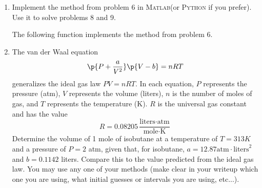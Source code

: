 \documentclass[11pt, oneside]{article}
\newcommand{\MATLAB}{\textsc{Matlab}\xspace}
\newcommand{\PYTHON}{\textsc{Python}\xspace}
\begin{document}
\begin{enumerate}
\begin{proof}
\begin{align*}
      \end{align*}
      \begin{align*}
        \intertext{Now use the Taylor series for $g(x_k + g(x_k))$.}
        x_{k+1} - x^* &= x_k - x^* - \frac{\br{g(x_k)}^2}{g(x_k) + g(x_k)g'(x_k) + g(x_k)^2g''(\xi_2)- g(x_k)} \\
        x_{k+1} - x^* &= x_k - x^* - \frac{\br{g(x_k)}^2}{g(x_k)g'(x_k) + g(x_k)^2g''(\xi_2)} \\
        x_{k+1} - x^* &= x_k - x^* - \frac{g(x_k)}{g'(x_k) + g(x_k)g''(\xi_2)}
        \intertext{Now use the Taylor expansion of $g(x_k)$.}
        x_{k+1} - x^* &= x_k - x^* - \frac{g(x^*) + (x_k - x^*)g'(x_k) + \frac{1}{2}(x_k - x^*)^2g''(\xi_1)}{g'(x_k) + g(x_k)g''(\xi_2)} \\
        x_{k+1} - x^* &= x_k - x^* - \frac{(x_k - x^*)g'(x_k) + \frac{1}{2}(x_k - x^*)^2g''(\xi_1)}{g'(x_k) + g(x_k)g''(\xi_2)} \\
        x_{k+1} - x^* &= x_k - x^* - \frac{(x_k - x^*)g'(x_k)}{g'(\xi_2)} - \frac{\frac{1}{2}(x_k - x^*)^2g''(\xi_1)}{g'(x_k) + g(x_k)g''(\xi_2)} \\
        x_{k+1} - x^* &= \p{x_k - x^*}\p{1 - \frac{g'(x_k)}{g'(x_k) + g(x_k)g''(\xi_2)}} - \frac{\frac{1}{2}(x_k - x^*)^2g''(\xi_1)}{g'(x_k) + g(x_k)g''(\xi_2)}
        \intertext{Note that as $k \to \infty$, $g(x_k) \to 0$ since this method is convergent.
          This also implies that $\xi_2 \to x_k$, therefore}
        \lim[k \to \infty]{\frac{\abs{x_{k+1} - x^*}}{\abs{x_{k}-x^*}}^2} &= \p{x_k - x^*}\p{1 - \frac{g'(x_k)}{g'(\xi_2)}} - \frac{\frac{1}{2}(x_k - x^*)^2g''(\xi_1)}{g'(\xi_2)}
      \end{align*}
    \end{proof}

  \item %
    Implement the method from problem 6 in \MATLAB (or \PYTHON if you prefer).
    Use it to solve problems 8 and 9.

    The following function implements the method from problem 6.
    

  \item %
    The van der Waal equation
    \[
      \p{P + \frac{a}{V^2}}\p{V - b} = nRT
    \]
    generalizes the ideal gas law $PV = nRT$.
    In each equation, $P$ represents the pressure (atm), $V$ represents the volume
    (liters), $n$ is the number of moles of gas, and $T$ represents the temperature
    (K).
    $R$ is the universal gas constant and has the value
    \[
      R = 0.08205 \frac{\text{liters} \cdot \text{atm}}{\text{mole}\cdot \text{K}}
    \]
    Determine the volume of 1 mole of isobutane at a temperature of $T = 313 K$ and
    a pressure of $P = 2$ atm, given that, for isobutane,
    $a = 12.87 \text{atm} \cdot \text{liters}^2$ and $b = 0.1142$ liters.
    Compare this to the value predicted from the ideal gas law.
    You may use any one of your methods (make clear in your writeup which one
    you are using, what initial guesses or intervals you are using, etc...).


\end{enumerate}
\end{document}
